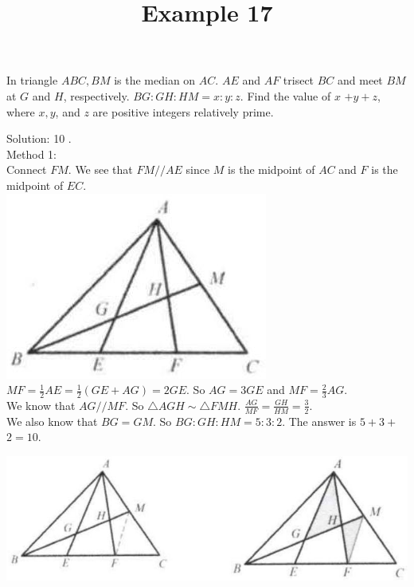 \documentclass{article}
\title{Example 17}
\date{}
\begin{document}
\maketitle

In triangle \(A B C, B M\) is the median on \(A C\). \(A E\) and \(A F\) trisect \(B C\) and meet \(B M\) at \(G\) and \(H\), respectively. \(B G: G H: H M=x: y: z\). Find the value of \(x\) \(+y+z\), where \(x, y\), and \(z\) are positive integers relatively prime.

Solution: 10 .\\
Method 1:\\
Connect \(F M\). We see that \(F M / / A E\) since \(M\) is the midpoint of \(A C\) and \(F\) is the midpoint of \(E C\).\\
\centering
\includegraphics[width=\textwidth]{images/118.jpg}\\
\(M F=\frac{1}{2} A E=\frac{1}{2}(G E+A G)=2 G E\). So \(A G=3 G E\) and \(M F=\frac{2}{3} A G\).\\
We know that \(A G / / M F\). So \(\triangle A G H \sim \triangle F M H\). \(\frac{A G}{M F}=\frac{G H}{H M}=\frac{3}{2}\).\\
We also know that \(B G=G M\). So \(B G: G H: H M=5: 3: 2\). The answer is \(5+3+\) \(2=10\).


\begin{center}
\includegraphics[width=\textwidth]{images/119.jpg}
\end{center}
\end{document}
